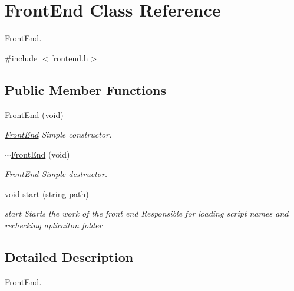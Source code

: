 \hypertarget{class_front_end}{\section{\-Front\-End \-Class \-Reference}
\label{class_front_end}
}


\hyperlink{class_front_end}{\-Front\-End}.  




{\ttfamily \#include $<$frontend.\-h$>$}

\subsection*{\-Public \-Member \-Functions}
\begin{DoxyCompactItemize}
\item 
\hypertarget{class_front_end_aae4a945ffe410716b187e36a2de284a2}{\hyperlink{class_front_end_aae4a945ffe410716b187e36a2de284a2}{\-Front\-End} (void)}\label{class_front_end_aae4a945ffe410716b187e36a2de284a2}

\begin{DoxyCompactList}\small\item\em \hyperlink{class_front_end}{\-Front\-End} \-Simple constructor. \end{DoxyCompactList}\item 
\hypertarget{class_front_end_a35bd35d626d499f9c7014328e8ca9569}{\hyperlink{class_front_end_a35bd35d626d499f9c7014328e8ca9569}{$\sim$\-Front\-End} (void)}\label{class_front_end_a35bd35d626d499f9c7014328e8ca9569}

\begin{DoxyCompactList}\small\item\em \hyperlink{class_front_end}{\-Front\-End} \-Simple destructor. \end{DoxyCompactList}\item 
void \hyperlink{class_front_end_a938c174c9b9663d1350497d837f10349}{start} (string path)
\begin{DoxyCompactList}\small\item\em start \-Starts the work of the front end \-Responsible for loading script names and rechecking aplicaiton folder \end{DoxyCompactList}\end{DoxyCompactItemize}


\subsection{\-Detailed \-Description}
\hyperlink{class_front_end}{\-Front\-End}. 

